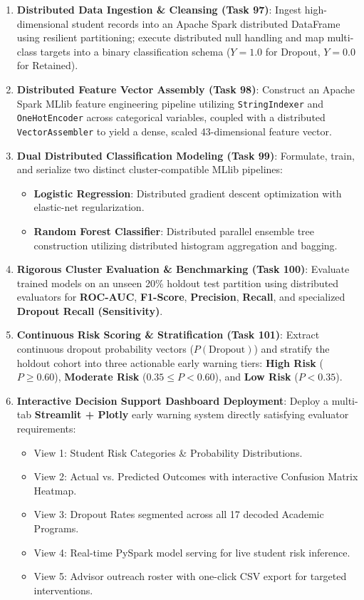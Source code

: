 \documentclass[11pt,a4paper]{article}
\begin{document}
\begin{enumerate}
    \item \textbf{Distributed Data Ingestion \& Cleansing (Task 97)}: Ingest high-dimensional student records into an Apache Spark distributed DataFrame using resilient partitioning; execute distributed null handling and map multi-class targets into a binary classification schema ($Y=1.0$ for Dropout, $Y=0.0$ for Retained).
    \item \textbf{Distributed Feature Vector Assembly (Task 98)}: Construct an Apache Spark MLlib feature engineering pipeline utilizing \texttt{StringIndexer} and \texttt{OneHotEncoder} across categorical variables, coupled with a distributed \texttt{VectorAssembler} to yield a dense, scaled 43-dimensional feature vector.
    \item \textbf{Dual Distributed Classification Modeling (Task 99)}: Formulate, train, and serialize two distinct cluster-compatible MLlib pipelines:
    \begin{itemize}
        \item \textbf{Logistic Regression}: Distributed gradient descent optimization with elastic-net regularization.
        \item \textbf{Random Forest Classifier}: Distributed parallel ensemble tree construction utilizing distributed histogram aggregation and bagging.
    \end{itemize}
    \item \textbf{Rigorous Cluster Evaluation \& Benchmarking (Task 100)}: Evaluate trained models on an unseen 20\% holdout test partition using distributed evaluators for \textbf{ROC-AUC}, \textbf{F1-Score}, \textbf{Precision}, \textbf{Recall}, and specialized \textbf{Dropout Recall (Sensitivity)}.
    \item \textbf{Continuous Risk Scoring \& Stratification (Task 101)}: Extract continuous dropout probability vectors ($P(\text{Dropout})$) and stratify the holdout cohort into three actionable early warning tiers: \textbf{High Risk} ($P \ge 0.60$), \textbf{Moderate Risk} ($0.35 \le P < 0.60$), and \textbf{Low Risk} ($P < 0.35$).
    \item \textbf{Interactive Decision Support Dashboard Deployment}: Deploy a multi-tab \textbf{Streamlit + Plotly} early warning system directly satisfying evaluator requirements:
    \begin{itemize}
        \item View 1: Student Risk Categories \& Probability Distributions.
        \item View 2: Actual vs. Predicted Outcomes with interactive Confusion Matrix Heatmap.
        \item View 3: Dropout Rates segmented across all 17 decoded Academic Programs.
        \item View 4: Real-time PySpark model serving for live student risk inference.
        \item View 5: Advisor outreach roster with one-click CSV export for targeted interventions.
    \end{itemize}
\end{enumerate}
\end{document}
